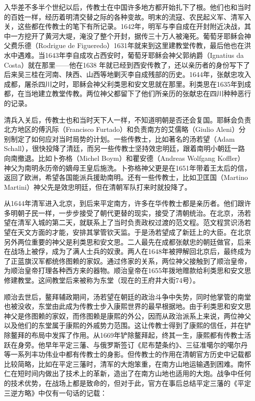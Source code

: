 
入华差不多半个世纪以后，传教士在中国许多地方都开始扎下了根。他们也和当时的百姓一样，经历着明清交替之际的各种变故。明末的流寇、农民起义军、清军入关，这些都在传教士的笔下有所记录。1642年，明军与李自成在开封附近决战，其中一方挖开了黄河大堤，淹没了整个开封，据传三十万人被淹死。葡萄牙耶稣会神父费乐德（Rodrigue de Figueredo）1631年就来到这里建教堂传教，最后他也在洪水中遇难。当1643年李自成攻占西安时，葡萄牙耶稣会神父郭纳爵（Ignatius da Costa）就在那里——他在1638 年就已经到西安传教了，还以亲历者的身份写下了后来吴三桂在河南、陕西、山西等地剿灭李自成残部的历史。1644年，张献忠攻入成都，屠杀四川之时，耶稣会神父利类思和安文思就在那里。利类思在1635年到成都，在当地建立教堂传教。两位神父都留下了他们所亲历的张献忠在四川种种恶行的记录。



清兵入关后，传教士也和当时天下人一样，不知道明朝是否还会复国。耶稣会负责北方地区的傅汎际（Francisco Furtado）和负责南方的艾儒略（Giulio Aleni）分别制定了如何应对当时局势的计划。一些传教士，比如著名的汤若望（Adam Schall），很快投降了清廷，而另一些传教士坚持效忠明廷，跟着南明小朝廷一路向南撤退。比如卜弥格（Michel Boym）和瞿安德（Andreas Wolfgang Koffler）神父为南明永历帝的嫡母王皇后施洗。卜弥格神父更是在1651年带着王太后的信，返回了欧洲，希望各国能派兵援助南明。还有一些传教士，比如卫匡国（Martino Martini）神父先是效忠明廷，但在清朝军队打来时就投降了。



从1644年清军进入北京，到后来平定南方，许多在华传教士都是亲历者。他们跟许多明朝子民一样，一步步接受了朝代更替的现实，接受了清朝统治。在北京，汤若望在清军入城的第二天，就联系上了当时负责政权过渡的范文程。范文程赏识汤若望在天文方面的才能，安排其掌管钦天监。于是汤若望成了新廷上的大臣。在北京另外两位重要的神父是利类思和安文思。二人最先在成都张献忠的朝廷做官，后来在战场上被俘，成为了满人士兵的奴隶。两人在1648年被押解回北京后，最终成为了正蓝旗汉军都统佟图赖的家奴。通过佟家的关系，两位神父接触到了顺治皇帝，为顺治皇帝打理各种西方来的器物。顺治皇帝在1655年拨地赠款给利类思和安文思修建教堂。这间教堂后来被称为东堂（现在的王府井大街74号）。



顺治去世后，鳌拜辅政期间，汤若望在朝廷的政治斗争中失势，同时他掌管的南堂也被没收，东堂由此成为传教士步入康熙世界的最早根据地。由于利类思和安文思神父是佟图赖的家奴，而佟图赖是康熙的外公，因而从政治派系上来说，两位神父以及他们的东堂属于康熙的外戚势力范围。这让传教士得到了康熙的信任，并在铲除鳌拜的布局中发挥了作用。从1669年铲除鳌拜起，终其一生，康熙都有传教士活跃在身旁。他早年平定三藩、与俄罗斯签订《尼布楚条约》、三征准噶尔的噶尔丹等一系列丰功伟业中都有传教士的身影。但传教士的作用在清朝官方历史中记载都比较简略，比如在平定三藩时，清军的大炮笨重，在南方山地运输遇到困难。南怀仁在短时间内做出了技术上的革新，造出了在南方山地也适用的大炮。战争中任何的技术优势，在战场上都是致命的，但对于此，官方在事后总结平定三藩的《平定三逆方略》中仅有一句话的记载：


